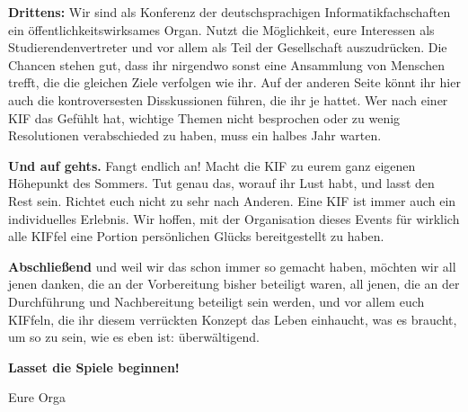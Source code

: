\textbf{Drittens:}
Wir sind als Konferenz der deutschsprachigen Informatikfachschaften ein öffentlichkeitswirksames Organ.
Nutzt die Möglichkeit, eure Interessen als Studierendenvertreter und vor allem als Teil der Gesellschaft auszudrücken.
Die Chancen stehen gut, dass ihr nirgendwo sonst eine Ansammlung von Menschen trefft, die die gleichen Ziele verfolgen wie ihr.
Auf der anderen Seite könnt ihr hier auch die kontroversesten Disskussionen führen, die ihr je hattet.
Wer nach einer KIF das Gefühlt hat, wichtige Themen nicht besprochen oder zu wenig Resolutionen verabschieded zu haben, muss ein halbes Jahr warten.

\textbf{Und auf gehts.}
Fangt endlich an!
Macht die KIF zu eurem ganz eigenen Höhepunkt des Sommers.
Tut genau das, worauf ihr Lust habt, und lasst den Rest sein.
Richtet euch nicht zu sehr nach Anderen.
Eine KIF ist immer auch ein individuelles Erlebnis.
Wir hoffen, mit der Organisation dieses Events für wirklich alle KIFfel eine Portion persönlichen Glücks bereitgestellt zu haben.

\textbf{Abschließend} und weil wir das schon immer so gemacht haben, möchten wir all jenen danken, die an der Vorbereitung bisher beteiligt waren, all jenen, die an der Durchführung und Nachbereitung beteiligt sein werden, und vor allem euch KIFfeln, die ihr diesem verrückten Konzept das Leben einhaucht, was es braucht, um so zu sein, wie es eben ist: überwältigend.

\textbf{Lasset die Spiele beginnen!}

\vspace{5mm}
\noindent
Eure Orga
